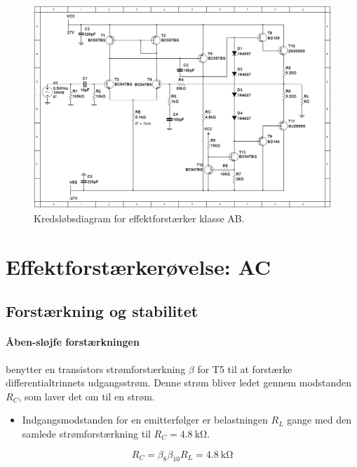 \documentclass[danish]{article}
\begin{document}
\begin{figure} [H]
	\centering
	\includegraphics[width=\linewidth]{graphics/PowerAmp_schematic}
	\caption{Kredsløbsdiagram for effektforstærker klasse AB.}
	\label{fig:PowerAmp_schematic}
\end{figure}

\newpage
\section{Effektforstærkerøvelse: AC}

\subsection{Forstærkning og stabilitet}

\paragraph{Åben-sløjfe forstærkningen} benytter en transistors strømforstærkning $\beta$ for T5 til at forstærke differentialtrinnets udgangsstrøm. Denne strøm bliver ledet gennem modstanden $R_C$, som laver det om til en strøm. 

\begin{itemize}
	\item Indgangsmodstanden for en emitterfølger er belastningen $R_L$ gange med den samlede strømforstærkning til $R_C = \SI{4.8}{\kilo\ohm}$.
\end{itemize}

\begin{equation}
R_C = \beta_8 \beta_{10} R_L = \SI{4.8}{\kilo\ohm}
\end{equation}
\end{document}
